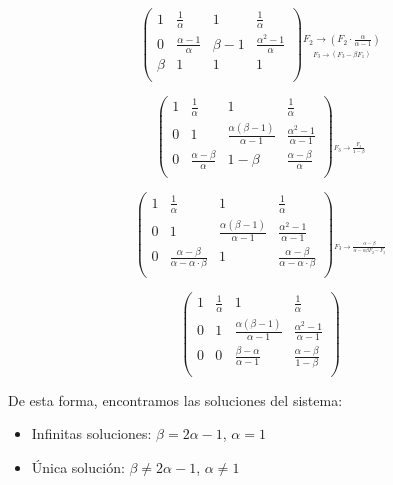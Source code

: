 \documentclass[11pt,a4paper]{article}
\begin{document}
\begin{enumerate}
$$
\left(\begin{array}{ccc|c}  
 1 & \frac{1}{\alpha} & 1 & \frac{1}{\alpha} \\  
 0 & \frac{\alpha-1}{\alpha} & \beta -1 & \frac{\alpha^2-1}{\alpha}  \\ 
 \beta & 1 & 1 & 1   \\ 
\end{array}\right) \underset{\overset{F_3\rightarrow (F_3-\beta F_1)}{}}{\overset{F_2\rightarrow (F_2\cdot \frac{\alpha}{\alpha-1})}{}}
$$

$$
\left(\begin{array}{ccc|c}  
 1 & \frac{1}{\alpha} & 1 & \frac{1}{\alpha} \\  
 0 & 1 & \frac{\alpha(\beta-1)}{\alpha-1} & \frac{\alpha^2-1}{\alpha-1}  \\ 
 0 & \frac{\alpha-\beta}{\alpha} & 1-\beta & \frac{\alpha-\beta}{\alpha}   \\ 
\end{array}\right) \underset{\overset{F_3\rightarrow \frac{F_3}{1-\beta}}{}}{}{}
$$

$$
\left(\begin{array}{ccc|c}  
 1 & \frac{1}{\alpha} & 1 & \frac{1}{\alpha} \\  
 0 & 1 & \frac{\alpha(\beta-1)}{\alpha-1} & \frac{\alpha^2-1}{\alpha-1}  \\ 
 0 & \frac{\alpha-\beta}{\alpha-\alpha \cdot \beta} & 1& \frac{\alpha-\beta}{\alpha-\alpha \cdot \beta}   \\ 
\end{array}\right) \underset{\overset{F_3\rightarrow \frac{\alpha-\beta}{\alpha-\alpha\beta F_2 - F_3}}{}}{}{}
$$

$$
\left(\begin{array}{ccc|c}  
 1 & \frac{1}{\alpha} & 1 & \frac{1}{\alpha} \\  
 0 & 1 & \frac{\alpha(\beta-1)}{\alpha-1} & \frac{\alpha^2-1}{\alpha-1}  \\ 
 0 & 0 & \frac{\beta-\alpha}{\alpha-1} & \frac{\alpha-\beta}{1-\beta}   \\ 
\end{array}\right)
$$

De esta forma, encontramos las soluciones del sistema:

\begin{itemize}
\item Infinitas soluciones: $\beta = 2\alpha-1$, $\alpha=1$
\end{itemize}

\begin{itemize}
\item Única solución: $\beta \neq 2\alpha-1$, $\alpha\neq1$
\end{itemize}


\end{enumerate}
\end{document}
